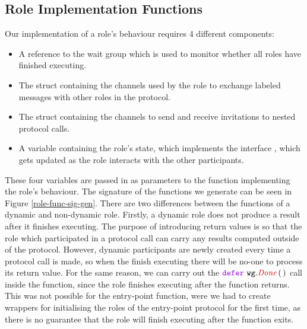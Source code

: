 \documentclass[12pt,twoside]{report}
\begin{document}
\subsection{Role Implementation Functions}
Our implementation of a role's behaviour requires 4 different components: 
\begin{itemize}
    \item A reference to the wait group which is used to monitor whether all roles have finished executing.
    \item The struct containing the channels used by the role to exchange labeled messages with other roles in the protocol.
    \item The struct containing the channels to send and receive invitations to nested protocol calls.
    \item A variable containing the role's state, which implements the interface {\color{dkyellow} \textit{}}, which gets updated as the role interacts with the other participants.
\end{itemize}

These four variables are passed in as parameters to the function implementing the role's behaviour. The signature of the functions we generate can be seen in Figure \ref{role-func-sig-gen}. There are two differences between the functions of a dynamic and non-dynamic role. Firstly, a dynamic role does not produce a result after it finishes executing. The purpose of introducing return values is so that the role which participated in a protocol call can carry any results computed outside of the protocol. However, dynamic participants are newly created every time a protocol call is made, so when the finish executing there will be no-one to process its return value. For the same reason, we can carry out the $\godefer\ \methodcall{wg}{Done}\,(\,)$ call inside the function, since the role finishes executing after the function returns. This was not possible for the entry-point function, were we had to create wrappers for initialising the roles of the entry-point protocol for the first time, as there is no guarantee that the role will finish executing after the function exits. 
\end{document}
